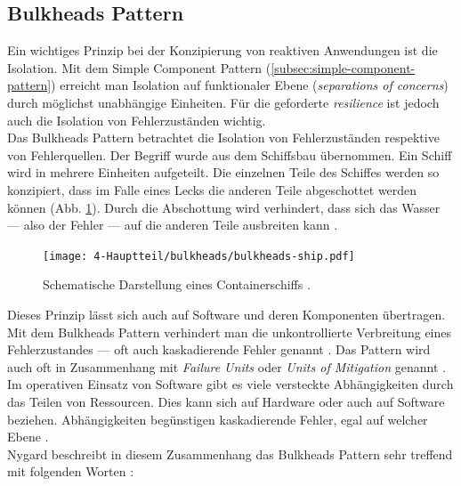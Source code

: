 \subsection{Bulkheads Pattern}
Ein wichtiges Prinzip bei der Konzipierung von reaktiven Anwendungen ist die Isolation. Mit dem Simple Component Pattern (\ref{subsec:simple-component-pattern}) erreicht man Isolation auf funktionaler Ebene (\textit{separations of concerns}) durch möglichst unabhängige Einheiten. Für die geforderte \textit{resilience} ist jedoch auch die Isolation von Fehlerzuständen wichtig.\\
Das Bulkheads Pattern betrachtet die Isolation von Fehlerzuständen respektive von Fehlerquellen. Der Begriff wurde aus dem Schiffsbau übernommen. Ein Schiff wird in mehrere Einheiten aufgeteilt. Die einzelnen Teile des Schiffes werden so konzipiert, dass im Falle eines Lecks die anderen Teile abgeschottet werden können (Abb. \ref{fig:bulkheads-ship}). Durch die Abschottung wird verhindert, dass sich das Wasser --- also der Fehler --- auf die anderen Teile ausbreiten kann \cite[S.~95]{nygard_release_2007} \cite[S.~214]{newman_building_2015} \cite[S.~35]{kuhn_reactive_2015}.\\

\begin{figure}[H]
 \centering
 \texttt{[image: 4-Hauptteil/bulkheads/bulkheads-ship.pdf]}
 \caption{Schematische Darstellung eines Containerschiffs \cite[S.~35]{kuhn_reactive_2015}.}
 \label{fig:bulkheads-ship}
\end{figure}

Dieses Prinzip lässt sich auch auf Software und deren Komponenten übertragen. Mit dem Bulkheads Pattern verhindert man die unkontrollierte Verbreitung eines Fehlerzustandes --- oft auch kaskadierende Fehler genannt \cite{friedrichsen_unkaputtbar_2014}. Das Pattern wird auch oft in Zusammenhang mit \textit{Failure Units} oder \textit{Units of Mitigation} genannt \cite{friedrichsen_unkaputtbar_2014}.\\
Im operativen Einsatz von Software gibt es viele versteckte Abhängigkeiten durch das Teilen von Ressourcen. Dies kann sich auf Hardware oder auch auf Software beziehen. Abhängigkeiten begünstigen kaskadierende Fehler, egal auf welcher Ebene \cite[S.~96]{nygard_release_2007} \cite{friedrichsen_unkaputtbar_2014}.\\

Nygard beschreibt in diesem Zusammenhang das Bulkheads Pattern sehr treffend mit folgenden Worten \cite[S.~96]{nygard_release_2007}:

